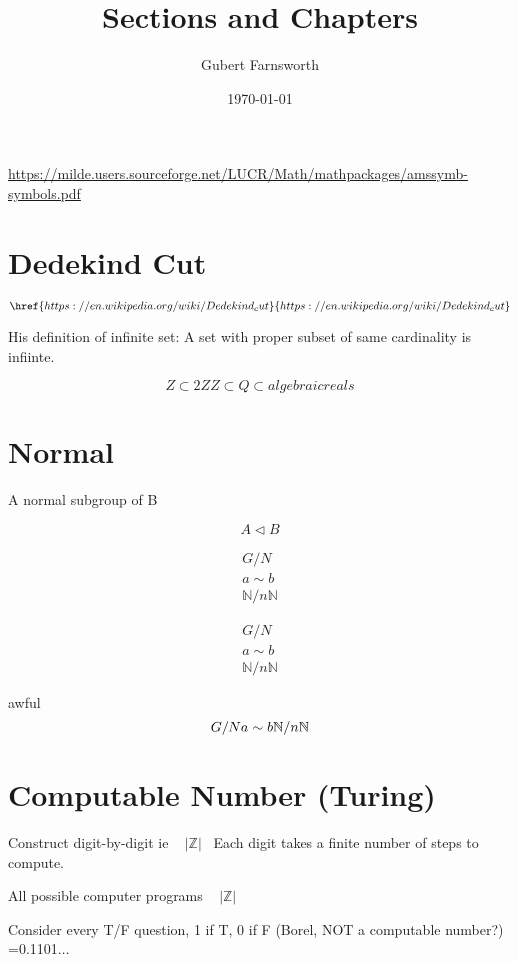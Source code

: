 \documentclass{article}
\title{Sections and Chapters}
\author{Gubert Farnsworth}
\date{\today}
\begin{document}
\url{https://milde.users.sourceforge.net/LUCR/Math/mathpackages/amssymb-symbols.pdf}


\section {Dedekind Cut}

$$
\href{https://en.wikipedia.org/wiki/Dedekind_cut}{https://en.wikipedia.org/wiki/Dedekind_cut}
$$


His definition of infinite set:   A set with proper subset of same cardinality
is infiinte.

$$
Z \subset 2Z
Z \subset Q \subset algebraic reals
$$


\section { Normal }
A normal subgroup of B

$$
A	\vartriangleleft B
$$

\begin{align*}
G/N \\  
a \sim b \\
\mathbb{N} / n\mathbb{N}
\end{align*}

\begin{align}
G/N \\  
a \sim b \\
\mathbb{N} / n\mathbb{N}
\end{align}

awful
\begin{equation}
G/N \\  
a \sim b \\
\mathbb{N} / n\mathbb{N}
\end{equation}


\section {Computable Number (Turing)}
Construct digit-by-digit ie  ~ $|\mathbb{Z}|$ \
Each digit takes a finite number of steps to compute.


All possible computer programs ~ $|\mathbb{Z}|$

Consider every T/F question, 1 if T, 0 if F (Borel, NOT a computable number?)
=0.1101$\dots$
\end{document}
